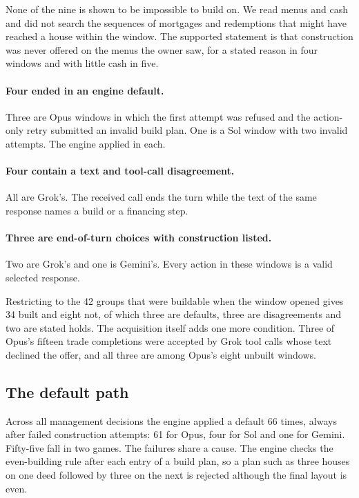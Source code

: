 None of the nine is shown to be impossible to build on. We read menus and cash and did not search the sequences of mortgages and redemptions that might have reached a house within the window. The supported statement is that construction was never offered on the menus the owner saw, for a stated reason in four windows and with little cash in five.

\paragraph{Four ended in an engine default.} Three are Opus windows in which the first attempt was refused and the action-only retry submitted an invalid build plan. One is a Sol window with two invalid attempts. The engine applied \End{} in each.

\paragraph{Four contain a text and tool-call disagreement.} All are Grok's. The received call ends the turn while the text of the same response names a build or a financing step.

\paragraph{Three are end-of-turn choices with construction listed.} Two are Grok's and one is Gemini's. Every action in these windows is a valid selected response.

Restricting to the 42 groups that were buildable when the window opened gives 34 built and eight not, of which three are defaults, three are disagreements and two are stated holds. The acquisition itself adds one more condition. Three of Opus's fifteen trade completions were accepted by Grok tool calls whose text declined the offer, and all three are among Opus's eight unbuilt windows.

\subsection{The default path}
\label{sec:defaults}

Across all management decisions the engine applied a default \End{} 66 times, always after failed construction attempts: 61 for Opus, four for Sol and one for Gemini. Fifty-five fall in two games. The failures share a cause. The engine checks the even-building rule after each entry of a build plan, so a plan such as three houses on one deed followed by three on the next is rejected although the final layout is even.

